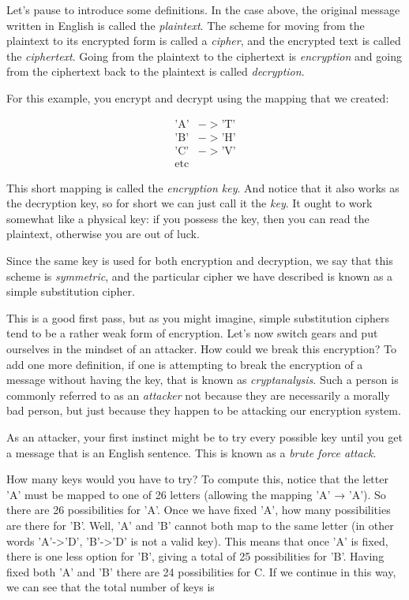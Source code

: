 \documentclass[UTF8]{book}
\begin{document}
\begin{CJK}{UTF8}{gbsn}
Let's pause to introduce some definitions. In the case above, the original message written in English is called the \emph{plaintext}. The scheme for moving from the plaintext to its encrypted form is called a \emph{cipher}, and the encrypted text is called the \emph{ciphertext}. Going from the plaintext to the ciphertext is \emph{encryption} and going from the ciphertext back to the plaintext is called \emph{decryption}.

For this example, you encrypt and decrypt using the mapping that we created:

\begin{align*}
	\text{'A'} &-> \text{'T'} \\
	\text{'B'} &-> \text{'H'} \\
	\text{'C'} &-> \text{'V'} \\
        \text{etc}
\end{align*}

This short mapping is called the \emph{encryption key}. And notice that it also works as the decryption key, so for short we can just call it the \emph{key}. It ought to work somewhat like a physical key: if you possess the key, then you can read the plaintext, otherwise you are out of luck.

Since the same key is used for both encryption and decryption, we say that this scheme is \emph{symmetric}, and the particular cipher we have described is known as a simple substitution cipher.

This is a good first pass, but as you might imagine, simple substitution ciphers tend to be a rather weak form of encryption. Let's now switch gears and put ourselves in the mindset of an attacker. How could we break this encryption? To add one more definition, if one is attempting to break the encryption of a message without having the key, that is known as \emph{cryptanalysis}. Such a person is commonly referred to as an \emph{attacker} not because they are necessarily a morally bad person, but just because they happen to be attacking our encryption system.

As an attacker, your first instinct might be to try every possible key until you get a message that is an English sentence. This is known as a \emph{brute force attack}.

How many keys would you have to try? To compute this, notice that the letter 'A' must be mapped to one of 26 letters (allowing the mapping 'A' → 'A'). So there are 26 possibilities for 'A'. Once we have fixed 'A', how many possibilities are there for 'B'. Well, 'A' and 'B' cannot both map to the same letter (in other words 'A'->'D', 'B'->'D' is not a valid key). This means that once 'A' is fixed, there is one less option for 'B', giving a total of 25 possibilities for 'B'. Having fixed both 'A' and 'B' there are 24 possibilities for C. If we continue in this way, we can see that the total number of keys is


\end{CJK}
\end{document}
